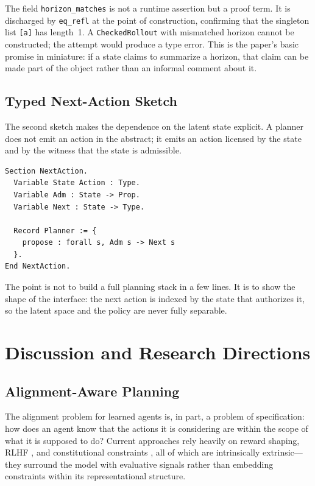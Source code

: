 \documentclass[12pt, a4paper]{article}
\begin{document}
The field \texttt{horizon\_matches} is not a runtime assertion but a proof
term. It is discharged by \texttt{eq\_refl} at the point of construction,
confirming that the singleton list \texttt{[a]} has length~1. A
\texttt{CheckedRollout} with mismatched horizon cannot be constructed; the
attempt would produce a type error. This is the paper's basic promise in
miniature: if a state claims to summarize a horizon, that claim can be made
part of the object rather than an informal comment about it.

\subsection{Typed Next-Action Sketch}

The second sketch makes the dependence on the latent state explicit. A planner
does not emit an action in the abstract; it emits an action licensed by the
state and by the witness that the state is admissible.

\begin{lstlisting}[caption={A dependent next-action family in Rocq},
                   label={lst:next-action}]
Section NextAction.
  Variable State Action : Type.
  Variable Adm : State -> Prop.
  Variable Next : State -> Type.

  Record Planner := {
    propose : forall s, Adm s -> Next s
  }.
End NextAction.
\end{lstlisting}

The point is not to build a full planning stack in a few lines. It is to show the
shape of the interface: the next action is indexed by the state that authorizes
it, so the latent space and the policy are never fully separable.

\section{Discussion and Research Directions}
\label{sec:discussion}

\subsection{Alignment-Aware Planning}

The alignment problem for learned agents \citep{russell2019human,
gabriel2020alignment} is, in part, a problem of specification: how does an
agent know that the actions it is considering are within the scope of what it
is supposed to do? Current approaches rely heavily on reward shaping, RLHF
\citep{christiano2017rlhf, bai2022training}, and constitutional constraints
\citep{bai2022constitutional}, all of which are intrinsically extrinsic—they
surround the model with evaluative signals rather than embedding constraints
within its representational structure.
\end{document}
